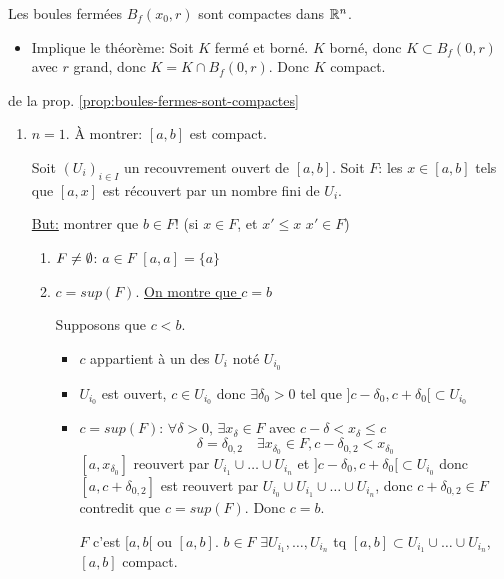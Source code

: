 \begin{prop}\label{prop:boules-fermes-sont-compactes}
   Les boules fermées $B_f(x_0, r)$ sont compactes dans $\mathbb{R}^n$. 
\end{prop}
\begin{itemize}
    \item Implique le théorème: Soit $K$ fermé et borné.  $K$ borné, donc  $K \subset B_f(0, r)$ avec $r$ grand, donc  $K = K \cap B_f(0, r)$. Donc  $K$ compact.
\end{itemize}
\begin{preuve} de la prop. \ref{prop:boules-fermes-sont-compactes}
   \begin{enumerate}
       \item $n = 1$.  À montrer: $[a, b]$ est compact.
           \par
           Soit  $(U_i)_{i \in I}$ un recouvrement ouvert de $[a, b]$. Soit  $F$: les  $x \in [a, b]$ tels que  $[a, x]$ est récouvert par un nombre fini de  $U_i$.
           \par
           \underline{But:} montrer que  $b \in F$! (si $x \in F$, et  $x' \le x$ $x' \in F$)
            \begin{enumerate}
                \item $F \neq \emptyset$: $a \in F$  $[a, a] = \{ a \}$
                \item  $c = sup(F)$. \underline{On montre que $c = b$} \par
                    Supposons que $c < b$.
                     \begin{itemize}
                        \item $c$ appartient à un des  $U_i$ noté  $U_{i_0}$
                        \item $U_{i_0}$ est ouvert, $c \in U_{i_0}$ donc $\exists \delta_0 > 0$ tel que $]c - \delta_0, c + \delta_0[ \subset U_{i_0}$
                        \item $c = sup(F)$:  $\forall \delta > 0, \, \exists x_{\delta} \in F$ avec $c - \delta < x_{\delta} \le c$
                            \[
                            \delta = \delta_{0,2} \quad \exists x_{\delta_0} \in F, c - \delta_{0,2} < x_{\delta_0}
                            \] 
                            $[a, x_{\delta_0}]$ reouvert par $U_{i_1} \cup \ldots \cup U_{i_n}$ et $]c - \delta_0, c + \delta_0[ \subset U_{i_0}$ donc $[a, c + \delta_{0,2}]$ est reouvert par $U_{i_0} \cup U_{i_1} \cup \ldots \cup U_{i_n}$, donc $c + \delta_{0, 2} \in F$ contredit que $c = sup(F)$. Donc  $c = b$.
                            \par
                            $F$ c'est  $[a, b[$ ou $[a, b]$.  $b \in F$  $\exists U_{i_1}, \ldots, U_{i_n}$ tq $[a, b] \subset U_{i_1} \cup \ldots \cup U_{i_n}$, $[a, b]$ compact.
                    \end{itemize}
            \end{enumerate}
   \end{enumerate}
\end{preuve}

